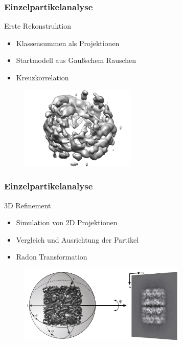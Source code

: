 \begin{frame}
	\frametitle{Einzelpartikelanalyse}
	\begin{block}{Erste Rekonstruktion}
		\begin{itemize}
			\item Klassensummen als Projektionen
			\item Startmodell aus Gaußschem Rauschen
			\item Kreuzkorrelation
		\end{itemize}
	\end{block}
	\begin{figure}
		\includegraphics[width = 5.5cm]{pic/recons.png}
	\end{figure}
\end{frame}

\begin{frame}
	\frametitle{Einzelpartikelanalyse}
	\begin{block}{3D Refinement}
		\begin{itemize}
			\item Simulation von 2D Projektionen
			\item Vergleich und Ausrichtung der Partikel
			\item Radon Transformation
		\end{itemize}
	\end{block}
	\begin{figure}
		\includegraphics[width = 8cm]{pic/epa1.png}
	\end{figure}
\end{frame}

